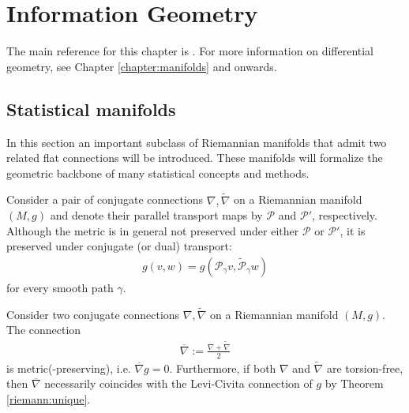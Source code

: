 \chapter{Information Geometry}\label{chapter:info}

    The main reference for this chapter is \cite{amari}. For more information on differential geometry, see Chapter \ref{chapter:manifolds} and onwards.

\section{Statistical manifolds}

    In this section an important subclass of Riemannian manifolds that admit two related flat connections will be introduced. These manifolds will formalize the geometric backbone of many statistical concepts and methods.

    \begin{property}
        Consider a pair of conjugate connections $\nabla,\widetilde{\nabla}$ on a Riemannian manifold $(M,g)$ and denote their parallel transport maps by $\mathcal{P}$ and $\mathcal{P'}$, respectively. Although the metric is in general not preserved under either $\mathcal{P}$ or $\mathcal{P}'$, it is preserved under conjugate (or dual) transport:
        \begin{gather}
            g(v,w) = g\left(\mathcal{P}_\gamma v,\widetilde{\mathcal{P}}_\gamma w\right)
        \end{gather}
        for every smooth path $\gamma$.
    \end{property}

    \begin{property}
        Consider two conjugate connections $\nabla,\widetilde{\nabla}$ on a Riemannian manifold $(M,g)$. The connection
        \begin{gather}
            \overline{\nabla} := \frac{\nabla+\widetilde{\nabla}}{2}
        \end{gather}
        is metric(-preserving), i.e. $\overline{\nabla}g=0$. Furthermore, if both $\nabla$ and $\widetilde{\nabla}$ are torsion-free, then $\overline{\nabla}$ necessarily coincides with the Levi-Civita connection of $g$ by Theorem \ref{riemann:unique}.
    \end{property}

